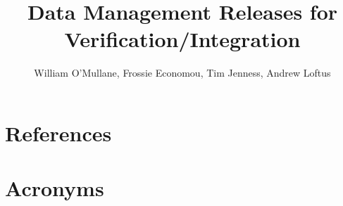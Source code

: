 \documentclass[DM,toc]{lsstdoc}
\title[DM Releases]{Data Management Releases for Verification/Integration}
\author   {William O'Mullane, Frossie Economou, Tim Jenness, Andrew Loftus}
\begin{document}
%
%
\maketitle

%
%



\section{References\label{sect:references}}
\renewcommand{\refname}{}


\section{Acronyms}
\end{document}
